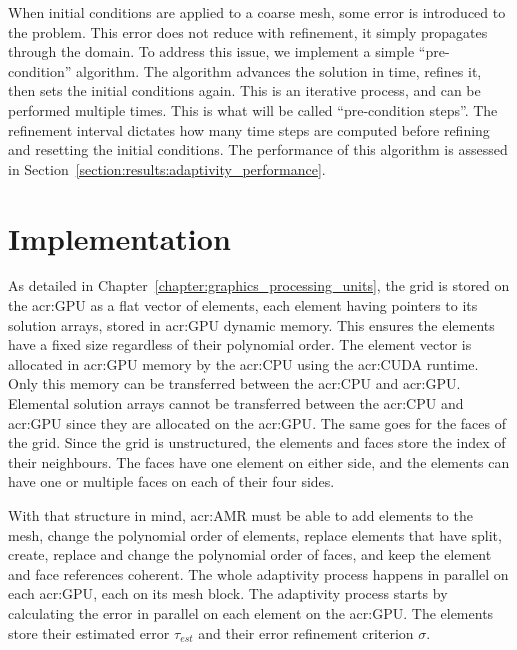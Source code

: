 When initial conditions are applied to a coarse mesh, some error is introduced to the problem. This
error does not reduce with refinement, it simply propagates through the domain. To address this
issue, we implement a simple ``pre-condition'' algorithm. The algorithm advances the solution in
time, refines it, then sets the initial conditions again. This is an iterative process, and can be
performed multiple times. This is what will be called ``pre-condition steps''. The refinement
interval dictates how many time steps are computed before refining and resetting the initial
conditions. The performance of this algorithm is assessed in
Section~\ref{section:results:adaptivity_performance}.

\section{Implementation}\label{section:adaptive_mesh_refinement:implementation}

As detailed in Chapter~\ref{chapter:graphics_processing_units}, the grid is stored on the
\acrshort{acr:GPU} as a flat vector of elements, each element having pointers to its solution
arrays, stored in \acrshort{acr:GPU} dynamic memory. This ensures the elements have a fixed size
regardless of their polynomial order. The element vector is allocated in \acrshort{acr:GPU} memory
by the \acrshort{acr:CPU} using the \acrshort{acr:CUDA} runtime. Only this memory can be transferred
between the \acrshort{acr:CPU} and \acrshort{acr:GPU}. Elemental solution arrays cannot be
transferred between the \acrshort{acr:CPU} and \acrshort{acr:GPU} since they are allocated on the
\acrshort{acr:GPU}. The same goes for the faces of the grid. Since the grid is unstructured, the
elements and faces store the index of their neighbours. The faces have one element on either side,
and the elements can have one or multiple faces on each of their four sides.

With that structure in mind, \acrlong{acr:AMR} must be able to add elements to the mesh, change the
polynomial order of elements, replace elements that have split, create, replace and change the
polynomial order of faces, and keep the element and face references coherent. The whole adaptivity
process happens in parallel on each \acrshort{acr:GPU}, each on its mesh block. The adaptivity
process starts by calculating the error in parallel on each element on the \acrshort{acr:GPU}. The
elements store their estimated error \(\tau_{est}\) and their error refinement criterion \(\sigma
\).

